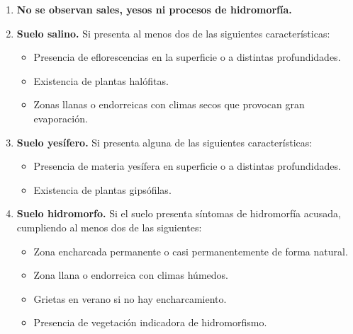 \begin{enumerate}
    \item \textbf{No se observan sales, yesos ni procesos de hidromorfía.}
    \item \textbf{Suelo salino.} Si presenta al menos dos de las siguientes características:
          \begin{itemize}
              \item Presencia de eflorescencias en la superficie o a distintas profundidades.
              \item Existencia de plantas halófitas.
              \item Zonas llanas o endorreicas con climas secos que provocan gran evaporación.
          \end{itemize}


    \item \textbf{Suelo yesífero.} Si presenta alguna de las siguientes características:
          \begin{itemize}
              \item Presencia de materia yesífera en superficie o a distintas profundidades.
              \item Existencia de plantas gipsófilas.
          \end{itemize}


    \item \textbf{Suelo hidromorfo.} Si el suelo presenta síntomas de hidromorfía acusada, cumpliendo al menos dos de las siguientes:
          \begin{itemize}
              \item Zona encharcada permanente o casi permanentemente de forma natural.
              \item Zona llana o endorreica con climas húmedos.
              \item Grietas en verano si no hay encharcamiento.
              \item Presencia de vegetación indicadora de hidromorfismo.
          \end{itemize}
\end{enumerate}


